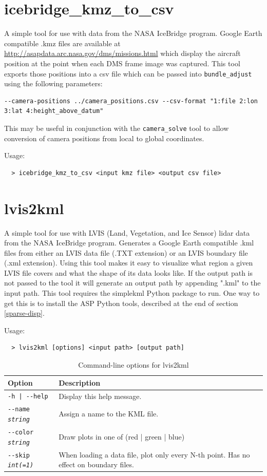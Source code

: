 \section{icebridge\_kmz\_to\_csv}
\label{icebridgekmztocsv}

A simple tool for use with data from the NASA IceBridge program.  Google Earth compatible
.kmz files are available at \url{http://asapdata.arc.nasa.gov/dms/missions.html} which display
the aircraft position at the point when each DMS frame image was captured.  This tool exports
those positions into a csv file which can be passed into \texttt{bundle\_adjust} using
the following parameters:
\begin{verbatim}
--camera-positions ../camera_positions.csv --csv-format "1:file 2:lon 3:lat 4:height_above_datum"
\end{verbatim}
This may be useful in conjunction with the \texttt{camera\_solve} tool to allow conversion of camera
positions from local to global coordinates.

Usage:
\begin{verbatim}
  > icebridge_kmz_to_csv <input kmz file> <output csv file>
\end{verbatim}



\section{lvis2kml}
\label{lvis2kml}

A simple tool for use with LVIS (Land, Vegetation, and Ice Sensor) lidar data from the
NASA IceBridge program.  Generates a Google Earth compatible .kml files from either
an LVIS data file (.TXT extension) or an LVIS boundary file (.xml extension).  Using
this tool makes it easy to visualize what region a given LVIS file covers and what
the shape of its data looks like.  If the output path is not passed to the tool it
will generate an output path by appending ".kml" to the input path.  This tool requires
the simplekml Python package to run.  One way to get this is to install the ASP Python
tools, described at the end of section \ref{sparse-disp}.

Usage:
\begin{verbatim}
  > lvis2kml [options] <input path> [output path]
\end{verbatim}


\begin{longtable}{|l|p{7.5cm}|}
\caption{Command-line options for lvis2kml}
\label{tbl:lvis2kml}
\endfirsthead
\endhead
\endfoot
\endlastfoot
\hline
Option & Description \\ \hline \hline
\texttt{-h | -\/-help } & Display this help message.\\ \hline
\texttt{-\/-name  \textit{string}} & Assign a name to the KML file.\\ \hline
\texttt{-\/-color  \textit{string}} & Draw plots in one of (red | green | blue)\\ \hline
\texttt{-\/-skip  \textit{int(=1)}} & When loading a data file, plot only every N-th point.
Has no effect on boundary files.\\ \hline
\end{longtable}

